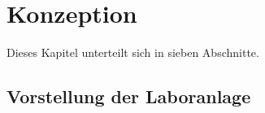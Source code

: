 \documentclass[../Bachelorarbeit.tex]{subfiles}
\begin{document}
\section{Konzeption}
Dieses Kapitel unterteilt sich in sieben Abschnitte.

\subsection{Vorstellung der Laboranlage}
\blindtext[1]
\end{document}
